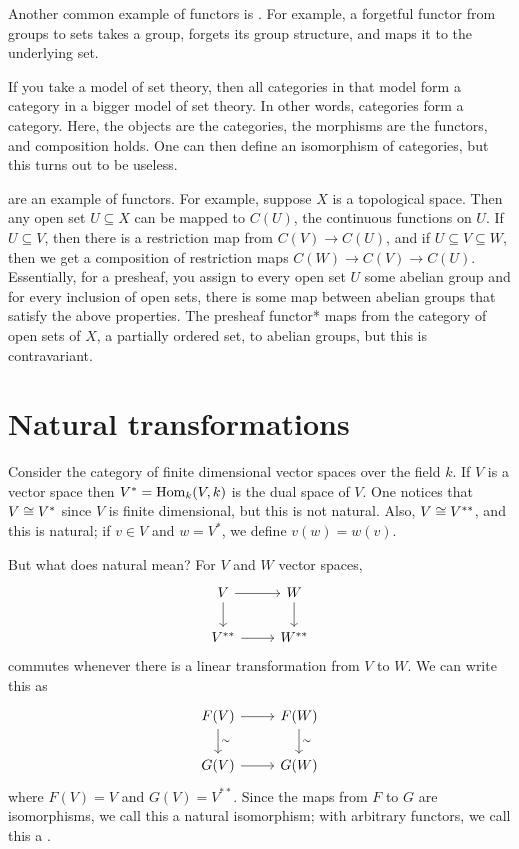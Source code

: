 \documentclass[11pt, oneside]{article}
\begin{document}
Another common example of functors is \href{https://en.wikipedia.org/wiki/Forgetful_functor}{}. For example, a forgetful functor from groups to sets takes a group, forgets its group structure, and maps it to the underlying set.

If you take a model of set theory, then all categories in that model form a category in a bigger model of set theory. In other words, categories form a category. Here, the objects are the categories, the morphisms are the functors, and composition holds. One can then define an isomorphism of categories, but this turns out to be useless. 

\href{https://en.wikipedia.org/wiki/Sheaf_(mathematics)#Presheaves}{} are an example of functors. For example, suppose $X$ is a topological space. Then any open set $U\subseteq X$ can be mapped to $C(U)$, the continuous functions on $U$. If $U\subseteq V$, then there is a restriction map from $C(V) \longrightarrow C(U)$, and if $U\subseteq V\subseteq W$, then we get a composition of restriction maps $C(W) \longrightarrow C(V) \longrightarrow C(U)$. Essentially, for a presheaf, you assign to every open set $U$ some abelian group and for every inclusion of open sets, there is some map between abelian groups that satisfy the above properties. The presheaf functor* maps from the category of open sets of $X$, a partially ordered set, to abelian groups, but this is contravariant.


\section{Natural transformations}
Consider the category of finite dimensional vector spaces over the field $k$. If $V$ is a vector space then $V^*=\operatorname{Hom}_k(V,k)$ is the dual space of $V$. One notices that $V\cong V^*$ since $V$ is finite dimensional, but this is not natural. Also, $V\cong V^{**}$, and this is natural; if $v\in V$ and $w = V^*$, we define $v(w) = w(v)$. 

But what does natural mean? For $V$ and $W$ vector spaces, 
\[
\begin{tikzcd}
V \arrow[r] \arrow[d] & W \arrow[d]\\ V^{**} \arrow[r] & W^{**}
\end{tikzcd}
\]
commutes whenever there is a linear transformation from $V$ to $W$. We can write this as
\[
\begin{tikzcd}
F(V) \arrow[r] \arrow[d, "\sim"] & F(W) \arrow[d,"\sim"]\\ G(V) \arrow[r] & G(W)
\end{tikzcd}
\]
where $F(V) = V$ and $G(V) = V^{**}$. Since the maps from $F$ to $G$ are isomorphisms, we call this a natural isomorphism; with arbitrary functors, we call this a \href{https://en.wikipedia.org/wiki/Natural_transformation}{}.
\end{document}
